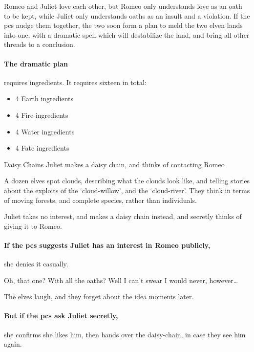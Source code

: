 
Romeo and Juliet love each other, but Romeo only understands love as an oath to be kept, while Juliet only understands oaths as an insult and a violation.
If the \glspl{pc} nudge them together, the two soon form a plan to meld the two elven lands into one, with a dramatic spell which will destabilize the land, and bring all other threads to a conclusion.

\paragraph{The dramatic plan}
requires \glspl{ingredient}.
It requires sixteen in total:

\begin{itemize}
  \item
  4 Earth \glspl{ingredient}
  \item
  4 Fire \glspl{ingredient}
  \item
  4 Water \glspl{ingredient}
  \item
  4 Fate \glspl{ingredient}
\end{itemize}


{Daisy Chains}%
{Juliet makes a daisy chain, and thinks of contacting Romeo}%

A dozen elves spot clouds, describing what the clouds look like, and telling stories about the exploits of the `cloud-willow', and the `cloud-river'.
They think in terms of moving forests, and complete species, rather than individuals.

Juliet takes no interest, and makes a daisy chain instead, and secretly thinks of giving it to Romeo.

\paragraph{If the \glspl{pc} suggests Juliet has an interest in Romeo publicly,}
she denies it casually.

\begin{speechtext}
  Oh, that one?
  With all the oaths?
  Well I can't swear I would never, however\ldots
\end{speechtext}

The elves laugh, and they forget about the idea moments later.

\paragraph{But if the \glspl{pc} ask Juliet secretly,}
she confirms she likes him, then hands over the daisy-chain, in case they see him again.

